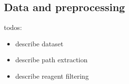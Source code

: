 
\subsection{Data and preprocessing}

todos:
\begin{itemize}
\item describe dataset
\item describe path extraction
\item describe reagent filtering
\end{itemize}
